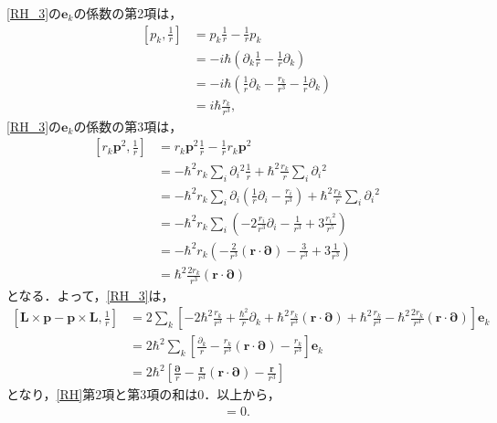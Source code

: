 \eqref{RH_3}の$\boldsymbol{e}_k$の係数の第2項は，
\begin{align*}
  \left[p_k,\frac{1}{r}\right]
  & = p_k\frac{1}{r} - \frac{1}{r}p_k\\
  & = - i\hbar\left(\partial_k\frac{1}{r} - \frac{1}{r}\partial_k\right)\\
  & = - i\hbar\left(\frac{1}{r}\partial_k - \frac{r_k}{r^3} - \frac{1}{r}\partial_k\right)\\
  & = i\hbar\frac{r_k}{r^3},
\end{align*}
\eqref{RH_3}の$\boldsymbol{e}_k$の係数の第3項は，
\begin{align*}
  \left[r_k\boldsymbol{p}^2,\frac{1}{r}\right]
  & = r_k\boldsymbol{p}^2\frac{1}{r} - \frac{1}{r}r_k\boldsymbol{p}^2\\
  & = - \hbar^2r_k\sum_i\partial_i{}^2\frac{1}{r} + \hbar^2\frac{r_k}{r}\sum_i\partial_i{}^2\\
  & = - \hbar^2r_k\sum_i\partial_i\left(\frac{1}{r}\partial_i - \frac{r_i}{r^3}\right) + \hbar^2\frac{r_k}{r}\sum_i\partial_i{}^2\\
  & = - \hbar^2r_k\sum_i\left( - 2\frac{r_i}{r^3}\partial_i - \frac{1}{r^3} + 3\frac{r_i{}^2}{r^5}\right)\\
  & = - \hbar^2r_k\left( - \frac{2}{r^3}(\boldsymbol{r}\cdot\boldsymbol{\partial}) - \frac{3}{r^3} + 3\frac{1}{r^3}\right)\\
  & = \hbar^2\frac{2r_k}{r^3}(\boldsymbol{r}\cdot\boldsymbol{\partial})
\end{align*}
となる．よって，\eqref{RH_3}は，
\begin{align*}
  \left[\boldsymbol{L}\times\boldsymbol{p} - \boldsymbol{p}\times\boldsymbol{L},\frac{1}{r}\right]
  & = 2\sum_k\left[ - 2\hbar^2\frac{r_k}{r^3} + \frac{\hbar^2}{r}\partial_k + \hbar^2\frac{r_k}{r^3}(\boldsymbol{r}\cdot\boldsymbol{\partial}) + \hbar^2\frac{r_k}{r^3} - \hbar^2\frac{2r_k}{r^3}(\boldsymbol{r}\cdot\boldsymbol{\partial})\right]\boldsymbol{e}_k\\
  & = 2\hbar^2\sum_k\left[\frac{\partial_k}{r} - \frac{r_k}{r^3}(\boldsymbol{r}\cdot\boldsymbol{\partial}) - \frac{r_k}{r^3}\right]\boldsymbol{e}_k\\
  & = 2\hbar^2\left[\frac{\boldsymbol{\partial}}{r} - \frac{\boldsymbol{r}}{r^3}(\boldsymbol{r}\cdot\boldsymbol{\partial}) - \frac{\boldsymbol{r}}{r^3}\right]
\end{align*}
となり，\eqref{RH}第2項と第3項の和は$0$．以上から，
\begin{align}
  [\boldsymbol{R},H]=0.
\end{align}

